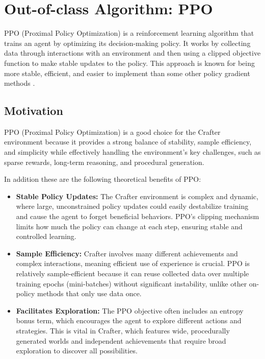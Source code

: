 \documentclass[twocolumn]{article}
\begin{document}
\section*{Out-of-class Algorithm: PPO}

PPO (Proximal Policy Optimization) is a reinforcement learning algorithm that trains an agent by optimizing its decision-making policy. It works by collecting data through interactions with an environment and then using a clipped objective function to make stable updates to the policy. This approach is known for being more stable, efficient, and easier to implement than some other policy gradient methods \parencite{schulman}.

\subsection*{Motivation}
PPO (Proximal Policy Optimization) is a good choice for the Crafter environment because it provides a strong balance of stability, sample efficiency, and simplicity while effectively handling the environment's key challenges, such as sparse rewards, long-term reasoning, and procedural generation. 

In addition these are the following theoretical benefits of PPO:
\begin{itemize}
    \item \textbf{Stable Policy Updates:} The Crafter environment is complex and dynamic, where large, unconstrained policy updates could easily destabilize training and cause the agent to forget beneficial behaviors. PPO's clipping mechanism limits how much the policy can change at each step, ensuring stable and controlled learning.
    \item \textbf{Sample Efficiency:} Crafter involves many different achievements and complex interactions, meaning efficient use of experience is crucial. PPO is relatively sample-efficient because it can reuse collected data over multiple training epochs (mini-batches) without significant instability, unlike other on-policy methods that only use data once.
    \item \textbf{Facilitates Exploration:} The PPO objective often includes an entropy bonus term, which encourages the agent to explore different actions and strategies. This is vital in Crafter, which features wide, procedurally generated worlds and independent achievements that require broad exploration to discover all possibilities.
\end{itemize}
\end{document}

